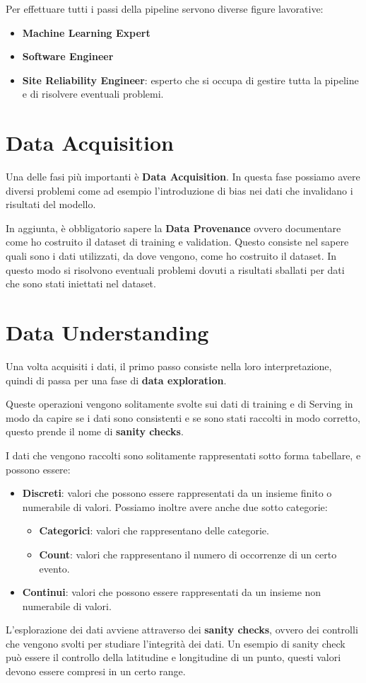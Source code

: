 Per effettuare tutti i passi della pipeline servono diverse figure lavorative:
\begin{itemize}
      \item \textbf{Machine Learning Expert}
      \item \textbf{Software Engineer}
      \item \textbf{Site Reliability Engineer}: esperto che si occupa di gestire
            tutta la pipeline e di risolvere eventuali problemi.
\end{itemize}
\section{Data Acquisition}
Una delle fasi più importanti è \textbf{Data Acquisition}. In questa fase possiamo
avere diversi problemi come ad esempio l'introduzione di bias nei dati che
invalidano i risultati del modello.

In aggiunta, è obbligatorio sapere la \textbf{Data Provenance} ovvero documentare
come ho costruito il dataset di training e validation. Questo consiste nel sapere
quali sono i dati utilizzati, da dove vengono, come ho costruito il dataset. In
questo modo si risolvono eventuali problemi dovuti a risultati sballati per dati
che sono stati iniettati nel dataset.
\section{Data Understanding}
Una volta acquisiti i dati, il primo passo consiste nella loro interpretazione,
quindi di passa per una fase di \textbf{data exploration}.

Queste operazioni vengono solitamente svolte sui dati di training e di Serving
in modo da capire se i dati sono consistenti e se sono stati raccolti in modo
corretto, questo prende il nome di \textbf{sanity checks}.

I dati che vengono raccolti sono solitamente rappresentati sotto forma tabellare,
e possono essere:
\begin{itemize}
      \item \textbf{Discreti}: valori che possono essere rappresentati da un insieme
            finito o numerabile di valori. Possiamo inoltre avere anche due sotto
            categorie:
            \begin{itemize}
                  \item \textbf{Categorici}: valori che rappresentano delle categorie.
                  \item \textbf{Count}: valori che rappresentano il numero di
                        occorrenze di un certo evento.
            \end{itemize}
      \item \textbf{Continui}: valori che possono essere rappresentati da un insieme
            non numerabile di valori.
\end{itemize}
L'esplorazione dei dati avviene attraverso dei \textbf{sanity checks}, ovvero dei
controlli che vengono svolti per studiare l'integrità dei dati. Un esempio di sanity
check può essere il controllo della latitudine e longitudine di un punto, questi
valori devono essere compresi in un certo range.


